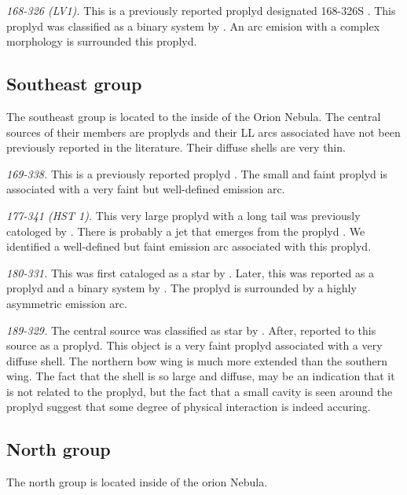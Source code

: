 \documentclass{article}
\begin{document}
\textit{168-326 (LV1).} This is a previously reported proplyd  designated 168-326S \citep{Odell:1994}. This proplyd was classified as a binary system by \citet{Ricci:2008}. An arc emision with a complex morphology is surrounded this proplyd.

\subsection{Southeast group}
\label{sec:SE}

The southeast group is located to the inside of the Orion Nebula. The central sources of their members are proplyds and their LL arcs associated have not been previously reported in the literature. Their diffuse shells are very thin. 

\textit{169-338.} This is a previously reported proplyd \citep{Odell:1994, Ricci:2008}. The small and faint proplyd is associated with a very faint but well-defined emission arc. 

\textit{177-341 (HST 1).} This very large proplyd with a long tail was previously catologed by \citet{Odell:1994, Ricci:2008}. There is probably a jet that emerges from the proplyd \citep{Bally:2000a}. We identified a well-defined but faint  emission arc associated with this proplyd.

\textit{180-331.} This was first cataloged as a star by \citet{Odell:1996}. Later, this was reported as a proplyd and a binary system by \citet{Ricci:2008}. The proplyd is surrounded by a highly asymmetric emission arc.

\textit{189-329.} The central source was classified as star by \citet{Odell:1996}. After, \citet{Ricci:2008} reported to this source as a proplyd. This object is a very faint proplyd associated with a very diffuse shell. The northern bow wing is much more extended than the southern wing. The fact that the shell is so large and diffuse, may be an indication that it is not related to the proplyd, but the fact that a small cavity is seen  around the proplyd suggest  that some degree of physical interaction is indeed accuring.

\subsection{North group}
\label{sec:N}

The north group is located inside of the orion Nebula.
\end{document}
